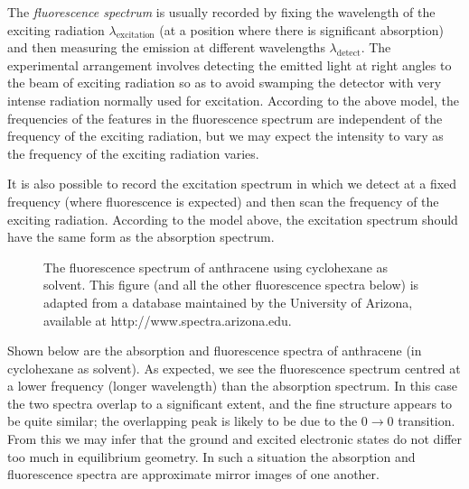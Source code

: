 \documentclass{article}
\theoremstyle{plain}\theoremheaderfont{\normalfont\itshape}\theorembodyfont{\rmfamily}\theoremseparator{.}\newtheorem*{rem}{Remark}\newtheorem*{ex}{Example}\newtheorem*{proof}{Proof}\newtheorem*{altp}{Alternative proof}
\theoremstyle{plain}\theoremheaderfont{\normalfont\bfseries}\theorembodyfont{\rmfamily}\theoremseparator{.}\newtheorem{thm}{Theorem}[section]\newtheorem{lem}[thm]{Lemma}\newtheorem{prop}[thm]{Proposition}\newtheorem*{cor}{Corollary}\newtheorem{defn}[thm]{Definition}\newtheorem{clm}[thm]{Claim}\newtheorem{clminproof}{Claim}\newtheorem{pos}{Postulate}[section]
\theoremstyle{break}\theoremheaderfont{\normalfont\itshape}\theorembodyfont{\rmfamily}\theoremseparator{.\medskip}\newtheorem*{proofskip}{Proof}\newtheorem*{exs}{Examples}\newtheorem*{rems}{Remarks}
\theoremstyle{break}\theoremheaderfont{\normalfont\bfseries}\theorembodyfont{\rmfamily}\theoremseparator{.\medskip}\newtheorem{lemskip}[thm]{Lemma}\newtheorem{defnskip}[thm]{Definition}\newtheorem{propskip}[thm]{Proposition}\newtheorem{thmskip}[thm]{Theorem}
\numberwithin{equation}{section}
\begin{document}
    The \textit{fluorescence spectrum} is usually recorded by fixing the wavelength of the exciting radiation \(\lambda_{\text{excitation}}\) (at a position where there is significant absorption) and then measuring the emission at different wavelengths \(\lambda_{\text{detect}}\). The experimental arrangement involves detecting the emitted light at right angles to the beam of exciting radiation so as to avoid swamping the detector with very intense radiation normally used for excitation. According to the above model, the frequencies of the features in the fluorescence spectrum are independent of the frequency of the exciting radiation, but we may expect the intensity to vary as the frequency of the exciting radiation varies.

    It is also possible to record the excitation spectrum in which we detect at a fixed frequency (where fluorescence is expected) and then scan the frequency of the exciting radiation. According to the model above, the excitation spectrum should have the same form as the absorption spectrum.

    \begin{figure}
        \centering
        \caption{The fluorescence spectrum of anthracene using cyclohexane as solvent. This figure (and all the other fluorescence spectra below) is adapted from a database maintained by the University of Arizona, available at http://www.spectra.arizona.edu.}
    \end{figure}

    Shown below are the absorption and fluorescence spectra of anthracene (in cyclohexane as solvent). As expected, we see the fluorescence spectrum centred at a lower frequency (longer wavelength) than the absorption spectrum. In this case the two spectra overlap to a significant extent, and the fine structure appears to be quite similar; the overlapping peak is likely to be due to the \(0\rightarrow 0\) transition. From this we may infer that the ground and excited electronic states do not differ too much in equilibrium geometry. In such a situation the absorption and fluorescence spectra are approximate mirror images of one another.
\end{document}
